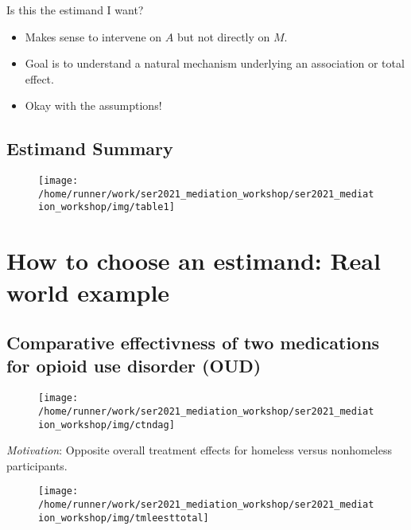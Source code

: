 \documentclass[
  12pt, krantz2,
]{book}
\providecommand{\tightlist}{%
  \setlength{\itemsep}{0pt}\setlength{\parskip}{0pt}}
\theoremstyle{definition}
\theoremstyle{definition}
\theoremstyle{definition}
\newcommand{\1}{\mathbbm{1}}
\begin{document}
Is this the estimand I want?

\begin{itemize}
\tightlist
\item
  Makes sense to intervene on \(A\) but not directly on \(M\).
\item
  Goal is to understand a natural mechanism underlying an association or total
  effect.
\item
  Okay with the assumptions!
\end{itemize}

\hypertarget{estimand-summary}{%
\section*{Estimand Summary}\label{estimand-summary}}


\begin{figure}

{\centering \texttt{[image: /home/runner/work/ser2021\_mediation\_workshop/ser2021\_mediation\_workshop/img/table1]} 

}

\end{figure}

\hypertarget{estimandirl}{%
\chapter{How to choose an estimand: Real world example}\label{estimandirl}}

\hypertarget{comparative-effectivness-of-two-medications-for-opioid-use-disorder-oud}{%
\section{Comparative effectivness of two medications for opioid use disorder (OUD)}\label{comparative-effectivness-of-two-medications-for-opioid-use-disorder-oud}}

\begin{figure}

{\centering \texttt{[image: /home/runner/work/ser2021\_mediation\_workshop/ser2021\_mediation\_workshop/img/ctndag]} 

}

\end{figure}

\emph{Motivation}: Opposite overall treatment effects for homeless versus
nonhomeless participants.

\begin{figure}

{\centering \texttt{[image: /home/runner/work/ser2021\_mediation\_workshop/ser2021\_mediation\_workshop/img/tmleesttotal]} 

}

\end{figure}
\end{document}
